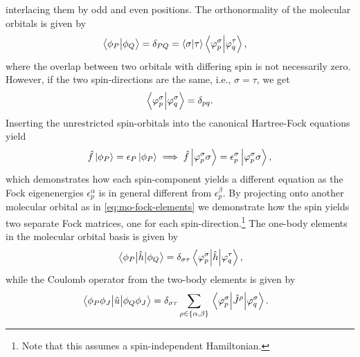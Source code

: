             interlacing them by odd and even positions.
            The orthonormality of the molecular orbitals is given by
            \begin{align}
                \braket{\phi_P}{\phi_Q}
                &= \delta_{PQ}
                = \braket{\sigma}{\tau}
                \braket{\varphi^{\sigma}_{p}}{\varphi^{\tau}_{q}},
            \end{align}
            where the overlap between two orbitals with differing spin is not
            necessarily zero.
            However, if the two spin-directions are the same, i.e., $\sigma =
            \tau$, we get
            \begin{align}
                \braket{\varphi^{\sigma}_{p}}{\varphi^{\sigma}_{q}}
                = \delta_{pq}.
            \end{align}
            Inserting the unrestricted spin-orbitals into the canonical
            Hartree-Fock equations yield
            \begin{align}
                \hat{f}\ket{\phi_P}
                = \epsilon_P\ket{\phi_P}
                \implies
                \hat{f}\ket{\varphi^{\sigma}_{p}\sigma}
                = \epsilon^{\sigma}_{p}\ket{\varphi^{\sigma}_{p} \sigma},
            \end{align}
            which demonstrates how each spin-component yields a different
            equation as the Fock eigenenergies $\epsilon^{\alpha}_{p}$ is in
            general different from $\epsilon^{\beta}_{p}$.
            By projecting onto another molecular orbital as in
            \autoref{eq:mo-fock-elements} we demonstrate how the spin yields two
            separate Fock matrices, one for each spin-direction.\footnote{%
                Note that this assumes a spin-independent Hamiltonian.
            }
            The one-body elements in the molecular orbital basis is given by
            \begin{align}
                \mel{\phi_P}{\hat{h}}{\phi_Q}
                = \delta_{\sigma\tau}
                \mel{\varphi^{\sigma}_{p}}{
                    \hat{h}}{\varphi^{\tau}_{q}},
            \end{align}
            while the Coulomb operator from the two-body elements is given by
            \begin{align}
                \mel{\phi_P\phi_J}{
                    \hat{u}}{\phi_Q\phi_J}
                &=
                \delta_{\sigma\tau}
                \sum_{\rho \in \left\{ \alpha, \beta \right\}}
                \mel{\varphi^{\sigma}_{p}}{
                    \hat{J}^{\rho}
                }{\varphi^{\sigma}_{q}}.
            \end{align}
